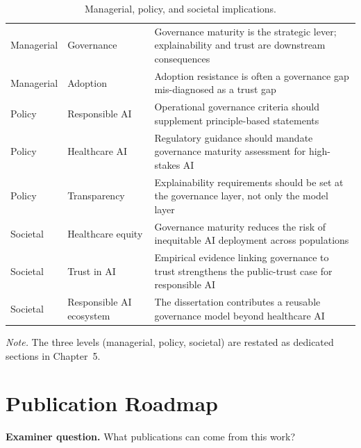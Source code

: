 {\tablestripes\tablefontsize
{}
\begin{xltabular}{\textwidth}{@{} >{\raggedright\arraybackslash}p{3.5cm} >{\raggedright\arraybackslash}p{4.0cm} L @{}}
\caption[Managerial, policy, and societal implications]{Managerial, policy, and societal implications.}\label{tab:dist_implications} \\
\toprule
{} &  &  \\
\midrule
\endfirsthead
\endhead
\bottomrule
\endlastfoot
Managerial & Governance & Governance maturity is the strategic lever; explainability and trust are downstream consequences \\
\addlinespace
Managerial & Adoption & Adoption resistance is often a governance gap mis-diagnosed as a trust gap \\
\addlinespace
Policy & Responsible AI & Operational governance criteria should supplement principle-based statements \\
\addlinespace
Policy & Healthcare AI & Regulatory guidance should mandate governance maturity assessment for high-stakes AI \\
\addlinespace
Policy & Transparency & Explainability requirements should be set at the governance layer, not only the model layer \\
\addlinespace
Societal & Healthcare equity & Governance maturity reduces the risk of inequitable AI deployment across populations \\
\addlinespace
Societal & Trust in AI & Empirical evidence linking governance to trust strengthens the public-trust case for responsible AI \\
\addlinespace
Societal & Responsible AI ecosystem & The dissertation contributes a reusable governance model beyond healthcare AI \\
\end{xltabular}}

\vspace{0.3em}\noindent\textit{Note.} The three levels (managerial, policy, societal) are restated as dedicated sections in Chapter~5.


\section{Publication Roadmap}
\label{app:distinction_publication_roadmap}

\noindent\textbf{Examiner question.} What publications can come from this work?

